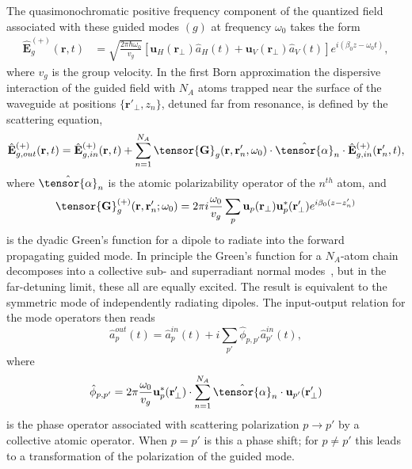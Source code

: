 \documentclass[preprint,aps,pra,onecolumn,superscriptaddress]{revtex4-1} %
\def\br{\mathbf{r}}
\newcommand{\mbf}[1]{\mathbf{#1}}
\begin{document}
The quasimonochromatic positive frequency component of the quantized field associated with these guided modes $(g)$ at frequency $\omega_0$ takes the form
\begin{align}\label{eq:Ebp}
\hat{\mathbf{E}}^{(+)}_g(\mbf{r}, t) &= \sqrt{ \frac{2 \pi \hbar \omega_0}{ v_g} } \left[\mathbf{u}_H(\mbf{r}\!_\perp)  \hat{a}_H(t) + \mathbf{u}_V(\mbf{r}\!_\perp) \hat{a}_V(t)\right]  e^{i (\beta_0 z- \omega_0 t)},
\end{align}
where $v_g$ is the group velocity.  In the first Born approximation the dispersive interaction of the guided field with $N_A$ atoms trapped near the surface of the waveguide at positions $\{\mbf{r}'_\perp, z_n\}$, detuned far from resonance,  is defined by the scattering equation,
\begin{equation}
\hat{\mathbf{E}}^{(+)}_{g,out}(\mbf{r}, t)=\hat{\mathbf{E}}^{(+)}_{g,in}(\mbf{r}, t)+\sum_{n=1}^{N_A} \tensor{\mbf{G}}_{g} (\mbf{r}, \mbf{r}'_n,\omega_0) \cdot \hat{\tensor{\alpha}}_n \cdot \hat{\mathbf{E}}^{(+)}_{g,in}(\mbf{r}'_n, t),
\end{equation}
where $\hat{\tensor{\alpha}}_n$ is the atomic polarizability operator of the $n^{th}$ atom, and 
\begin{equation}
		\tensor{\mathbf{G}}^{(+)}_g(\br,\br'_n; \omega_0) =  2\pi i \frac{\omega_0}{v_g } \sum_{p} \mathbf{u}_{p} (\br_\perp)\mathbf{u}^*_{p} 
(\br_{\perp}^\prime) e^{i \beta_0(z-z'_n)}  \label{Eq::GreensGuided}
\end{equation}
is the dyadic Green's function for a dipole to radiate into the forward propagating guided mode.  In principle the Green's function for a $N_A$-atom chain decomposes into a collective sub- and superradiant normal modes~\cite{Asenjo-Garcia2017Atom,Asenjo-Garcia2017Exponential}, but in the far-detuning limit, these all are equally excited.  The result is equivalent to the symmetric mode of independently radiating dipoles.  The input-output relation for the mode operators then reads
\begin{equation}
\hat{a}^{out}_p(t) = \hat{a}^{in}_p(t)  +i \sum_{p'} \hat{\phi}_{p,p'} \hat{a}^{in}_{p'}(t) ,
\end{equation}
where 
\begin{equation}
\hat{\phi}_{p,p'} = 2\pi \frac{\omega_0}{v_g} \mbf{u}^*_p (\mbf{r}'_\perp) \cdot \sum_{n=1}^{N_A} \hat{\tensor{\alpha}}_n \cdot \mbf{u}_{p'} (\mbf{r}'_\perp)
\end{equation}
is the phase operator associated with scattering polarization $p \rightarrow p'$ by a collective atomic operator.  When $p=p'$ is this a phase shift; for $p \neq p'$ this leads to a transformation of the polarization of the guided mode.
\end{document}
